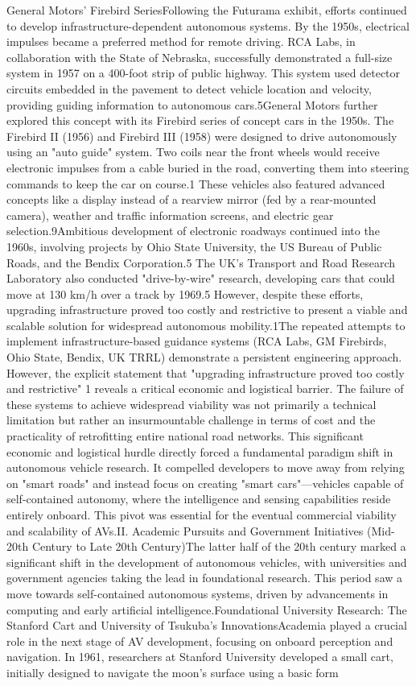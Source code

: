General Motors' Firebird SeriesFollowing the Futurama exhibit, efforts continued to develop infrastructure-dependent autonomous systems. By the 1950s, electrical impulses became a preferred method for remote driving. RCA Labs, in collaboration with the State of Nebraska, successfully demonstrated a full-size system in 1957 on a 400-foot strip of public highway. This system used detector circuits embedded in the pavement to detect vehicle location and velocity, providing guiding information to autonomous cars.5General Motors further explored this concept with its Firebird series of concept cars in the 1950s. The Firebird II (1956) and Firebird III (1958) were designed to drive autonomously using an "auto guide" system. Two coils near the front wheels would receive electronic impulses from a cable buried in the road, converting them into steering commands to keep the car on course.1 These vehicles also featured advanced concepts like a display instead of a rearview mirror (fed by a rear-mounted camera), weather and traffic information screens, and electric gear selection.9Ambitious development of electronic roadways continued into the 1960s, involving projects by Ohio State University, the US Bureau of Public Roads, and the Bendix Corporation.5 The UK's Transport and Road Research Laboratory also conducted "drive-by-wire" research, developing cars that could move at 130 km/h over a track by 1969.5 However, despite these efforts, upgrading infrastructure proved too costly and restrictive to present a viable and scalable solution for widespread autonomous mobility.1The repeated attempts to implement infrastructure-based guidance systems (RCA Labs, GM Firebirds, Ohio State, Bendix, UK TRRL) demonstrate a persistent engineering approach. However, the explicit statement that "upgrading infrastructure proved too costly and restrictive" 1 reveals a critical economic and logistical barrier. The failure of these systems to achieve widespread viability was not primarily a technical limitation but rather an insurmountable challenge in terms of cost and the practicality of retrofitting entire national road networks. This significant economic and logistical hurdle directly forced a fundamental paradigm shift in autonomous vehicle research. It compelled developers to move away from relying on "smart roads" and instead focus on creating "smart cars"—vehicles capable of self-contained autonomy, where the intelligence and sensing capabilities reside entirely onboard. This pivot was essential for the eventual commercial viability and scalability of AVs.II. Academic Pursuits and Government Initiatives (Mid-20th Century to Late 20th Century)The latter half of the 20th century marked a significant shift in the development of autonomous vehicles, with universities and government agencies taking the lead in foundational research. This period saw a move towards self-contained autonomous systems, driven by advancements in computing and early artificial intelligence.Foundational University Research: The Stanford Cart and University of Tsukuba's InnovationsAcademia played a crucial role in the next stage of AV development, focusing on onboard perception and navigation. In 1961, researchers at Stanford University developed a small cart, initially designed to navigate the moon's surface using a basic form 